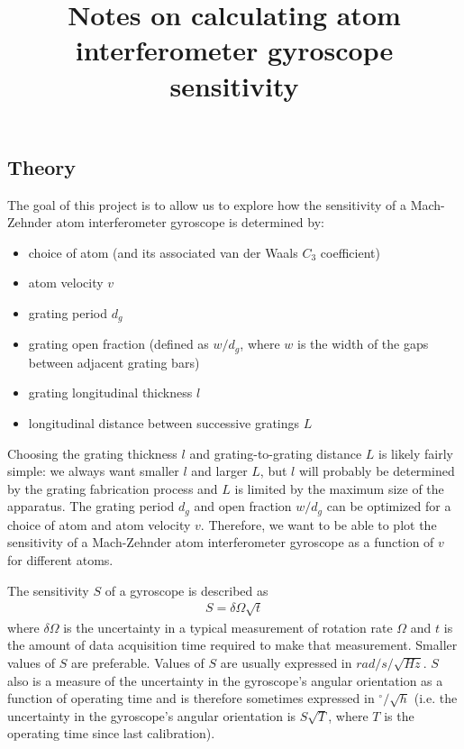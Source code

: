 \documentclass[twocolumn,pra,showpacs,superscriptaddress,longbibliography]{revtex4-1}   %
\begin{document}
\title{Notes on calculating atom interferometer gyroscope sensitivity}
\maketitle


\subsection{Theory}

The goal of this project is to allow us to explore how the sensitivity of a Mach-Zehnder atom interferometer gyroscope is determined by:
\begin{itemize}
	\item choice of atom (and its associated van der Waals $C_3$ coefficient)
	\item atom velocity $v$
	\item grating period $d_g$
	\item grating open fraction (defined as $w/d_g$, where $w$ is the width of the gaps between adjacent grating bars)
	\item grating longitudinal thickness $l$
	\item longitudinal distance between successive gratings $L$
\end{itemize}
Choosing the grating thickness $l$ and grating-to-grating distance $L$ is likely fairly simple: we always want smaller $l$ and larger $L$, but $l$ will probably be determined by the grating fabrication process and $L$ is limited by the maximum size of the apparatus. The grating period $d_g$ and open fraction $w/d_g$ can be optimized for a choice of atom and atom velocity $v$. Therefore, we want to be able to plot the sensitivity of a Mach-Zehnder atom interferometer gyroscope as a function of $v$ for different atoms.

The sensitivity $S$ of a gyroscope is described as 
\begin{align}
	S = \delta\Omega \sqrt{t}
	\label{sensitivityGeneral}
\end{align}
where $\delta\Omega$ is the uncertainty in a typical measurement of rotation rate $\Omega$ and $t$ is the amount of data acquisition time required to make that measurement. 
Smaller values of $S$ are preferable.
Values of $S$ are usually expressed in $rad/s/\sqrt{Hz}$. 
$S$ also is a measure of the uncertainty in the gyroscope's angular orientation as a function of operating time and is therefore sometimes expressed in $^{\circ}/\sqrt{h}$ (i.e. the uncertainty in the gyroscope's angular orientation is $S\sqrt{T}$, where $T$ is the operating time since last calibration).
\end{document}
